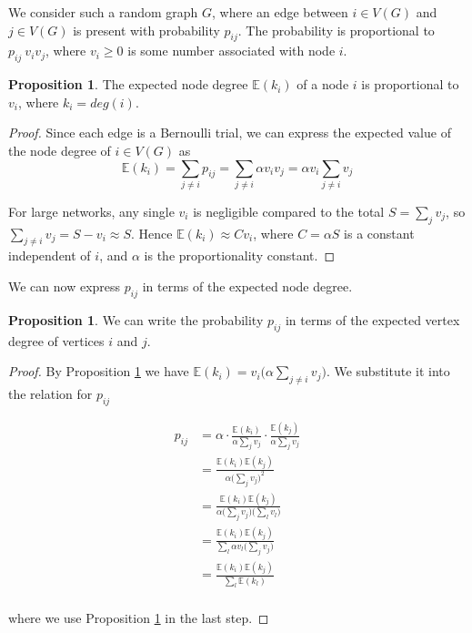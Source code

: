 \documentclass[12pt]{article}
\theoremstyle{definition}
\newtheorem{proposition}[theorem]{Proposition}
\begin{document}
We consider such a random graph $G$, where an edge between $i \in V(G)$ and $j \in V(G)$ is present with probability $p_{ij}$. The probability is proportional to $p_{ij} ~ v_i v_j$, where $v_i \geq 0$ is some number associated with node $i$.


\begin{proposition}
  \label{prop:exp_val_of_node_degree}
  The expected node degree $\mathbb E(k_i)$ of a node $i$ is proportional to $v_i$, where $k_i = deg(i)$.
\end{proposition}

\begin{proof}
  Since each edge is a Bernoulli trial, we can express the expected value of the node degree of $i \in V(G)$ as
  \[\mathbb E(k_i) = \sum_{j \neq i} p_{ij} = \sum_{j \neq i} \alpha v_i v_j = \alpha v_i
  \sum_{j \neq i} v_j\]

  \noindent
  For large networks, any single $v_i$ is negligible compared to the total $S = \sum_j v_j$, so $\sum_{j \neq i} v_j = S - v_i \approx S$. Hence $\mathbb E(k_i) \approx Cv_i$, where $C = \alpha S$ is a constant independent of $i$, and $\alpha$ is the proportionality constant.
\end{proof}


We can now express $p_{ij}$ in terms of the expected node degree.

\begin{proposition}
  \label{prop:prob_in_terms_of_exp_deg}
  We can write the probability $p_{ij}$ in terms of the expected vertex degree of vertices $i$ and $j$.
\end{proposition}

\begin{proof}
By Proposition \ref{prop:exp_val_of_node_degree} we have $\mathbb E(k_i) = v_i \big(\alpha \sum_{j \neq i} v_j\big)$. We substitute it into the relation for $p_{ij}$

\begin{align*}
  p_{ij} &= \alpha \cdot \frac{\mathbb E(k_i)}{\alpha \sum_j v_j} \cdot \frac{\mathbb E(k_j)}{\alpha \sum_j v_j}\\
  &= \frac{\mathbb E(k_i) \mathbb E(k_j)}{\alpha \big(\sum_j v_j\big)^2}\\
  &= \frac{\mathbb E(k_i) \mathbb E(k_j)}{\alpha \Big(\sum_j v_j\Big) \Big(\sum_l v_l\Big)}\\
  &= \frac{\mathbb E(k_i) \mathbb E(k_j)}{\sum_l \alpha v_l \Big(\sum_j v_j\Big)}\\
  &= \frac{\mathbb E(k_i) \mathbb E(k_j)}{
  \sum_l \mathbb{E}(k_l)}\\
\end{align*}

where we use Proposition \ref{prop:exp_val_of_node_degree} in the last step.
\end{proof}
\end{document}
